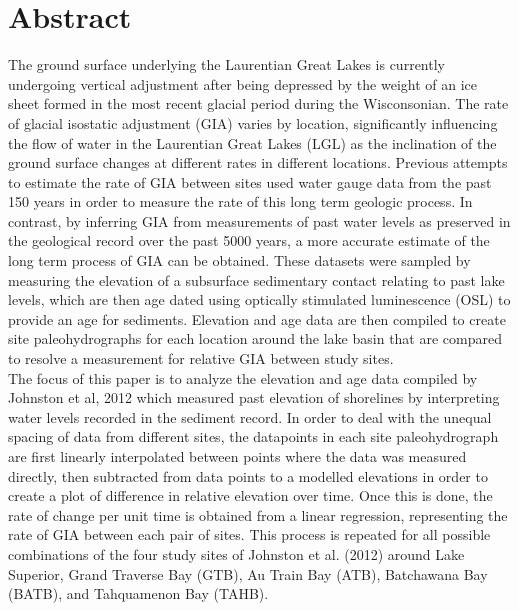 


\newcommand{\result}[1]{%
    \dtlgetrowforvalue{result}{\dtlcolumnindex{result}{id}}{#1}%
}



\section*{Abstract}

The ground surface underlying the Laurentian Great Lakes is currently undergoing vertical adjustment
 after being depressed by the weight of an ice sheet formed in the most recent glacial period during the Wisconsonian.
 The rate of glacial isostatic adjustment (GIA) varies by location, significantly influencing the flow of water
 in the Laurentian Great Lakes (LGL) as the inclination of the ground surface changes at different rates
 in different locations. Previous attempts to 
 estimate the rate of GIA between sites used water gauge data from the
 past 150 years in order to measure the rate of this long term geologic process. In contrast, by
 inferring GIA from measurements of past water levels as preserved in the geological record over the past 5000 years,
 a more accurate estimate of the long term process of GIA can be obtained. These
 datasets were sampled by measuring the elevation of a subsurface sedimentary contact relating to
 past lake levels, which are then age dated using optically stimulated luminescence
 (OSL) to provide an age for sediments. Elevation and age data are then compiled
 to create site paleohydrographs for each location around the lake basin that are
 compared to resolve a measurement for relative GIA between study sites.\\
 
 The focus of this paper is to analyze the elevation and age data compiled by Johnston et al, 2012
 which measured past elevation of shorelines by interpreting water levels recorded
 in the sediment record. In order to deal with the unequal spacing of data from
 different sites, the datapoints in each site paleohydrograph
 are first linearly interpolated between points where the data was measured directly, then subtracted
 from data points to a modelled elevations in order to create a
 plot of difference in relative elevation over time. Once this is done, the rate of change per unit
 time is obtained from a linear regression, representing the rate
 of GIA between each pair of sites. This process is repeated for
 all possible combinations of the four study sites of Johnston et al. (2012) around Lake Superior, 
 Grand Traverse Bay (GTB), Au Train Bay (ATB), Batchawana Bay (BATB), and Tahquamenon Bay (TAHB).\\
 

